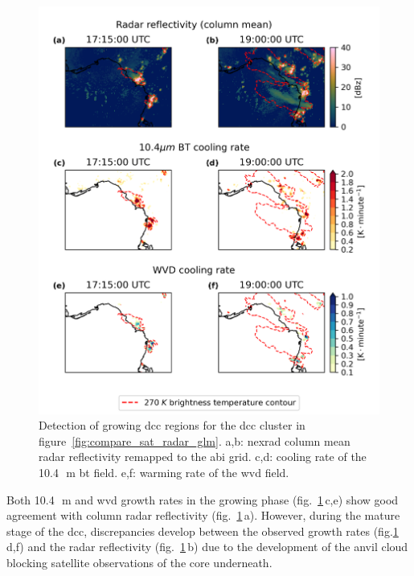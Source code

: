 \begin{figure}[tp]
    \includegraphics[width=\textwidth]{figures/chapter1_16.png}
    \caption[
    Detection of growing \acrshort{dcc} using \acrshort{nexrad} column radar reflectivity, 10.4\,\unit{\mu m} \acrshort{bt} and \acrshort{wvd} growth rates
    ]{
    Detection of growing \acrshort{dcc} regions for the \acrshort{dcc} cluster in figure~\ref{fig:compare_sat_radar_glm}. a,b: \acrshort{nexrad} column mean radar reflectivity remapped to the \acrshort{abi} grid. c,d: cooling rate of the 10.4\,\unit{\mu m} \acrshort{bt} field. e,f: warming rate of the \acrshort{wvd} field.
    }
    \label{fig:core_detection}
\end{figure}


Both 10.4\,\unit{\mu m} and \acrshort{wvd} growth rates in the growing phase (fig.~\ref{fig:core_detection}\,c,e) show good agreement with column radar reflectivity (fig.~\ref{fig:core_detection}\,a).
However, during the mature stage of the \acrshort{dcc}, discrepancies develop between the observed growth rates (fig.\ref{fig:core_detection}\,d,f) and the radar reflectivity (fig.~\ref{fig:core_detection}\,b) due to the development of the anvil cloud blocking satellite observations of the core underneath.


